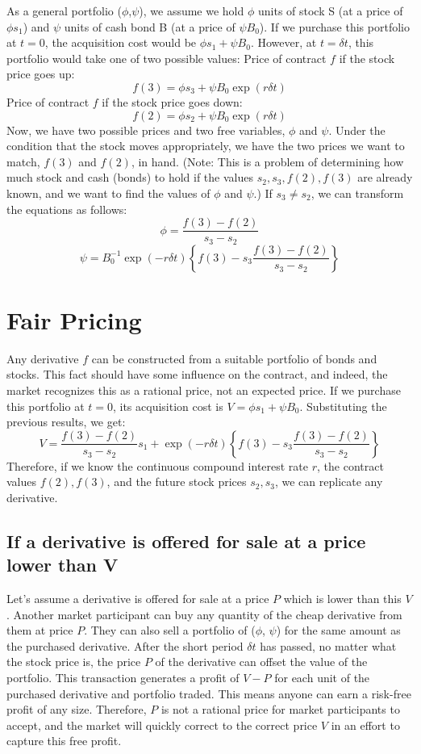 \documentclass[uplatex,a4j,12pt,dvipdfmx]{jsarticle}
\begin{document}
As a general portfolio ($\phi$,$\psi$), we assume we hold $\phi$ units of stock S (at a price of $\phi s_1$) and $\psi$ units of cash bond B (at a price of $\psi B_0$). If we purchase this portfolio at $t=0$, the acquisition cost would be $\phi s_1 + \psi B_0$. However, at $t=\delta t$, this portfolio would take one of two possible values:
Price of contract $f$ if the stock price goes up: \[f(3) = \phi s_3 + \psi B_0\exp(r\delta t)\]
Price of contract $f$ if the stock price goes down: \[f(2) = \phi s_2 + \psi B_0\exp(r\delta t)\]
Now, we have two possible prices and two free variables, $\phi$ and $\psi$. Under the condition that the stock moves appropriately, we have the two prices we want to match, $f(3)$ and $f(2)$, in hand. (Note: This is a problem of determining how much stock and cash (bonds) to hold if the values $s_2, s_3, f(2), f(3)$ are already known, and we want to find the values of $\phi$ and $\psi$.) If $s_3 \neq s_2$, we can transform the equations as follows:
\[\phi = \frac{f(3) - f(2)}{s_3 - s_2}\]
\[\psi = B_0^{-1} \exp(-r\delta t) \left\{ f(3) - s_3 \frac{f(3) - f(2)}{s_3 - s_2} \right\}\]

\section{Fair Pricing}
Any derivative $f$ can be constructed from a suitable portfolio of bonds and stocks. This fact should have some influence on the contract, and indeed, the market recognizes this as a rational price, not an expected price. If we purchase this portfolio at $t=0$, its acquisition cost is $V = \phi s_1 + \psi B_0$. Substituting the previous results, we get:
\[V = \frac{f(3) - f(2)}{s_3 - s_2} s_1 + \exp(-r\delta t) \left\{ f(3) - s_3 \frac{f(3) - f(2)}{s_3 - s_2} \right\}\]
Therefore, if we know the continuous compound interest rate $r$, the contract values $f(2), f(3)$, and the future stock prices $s_2, s_3$, we can replicate any derivative.

\subsection{If a derivative is offered for sale at a price lower than V}
Let's assume a derivative is offered for sale at a price $P$ which is lower than this $V$. Another market participant can buy any quantity of the cheap derivative from them at price $P$. They can also sell a portfolio of ($\phi$, $\psi$) for the same amount as the purchased derivative. After the short period $\delta t$ has passed, no matter what the stock price is, the price $P$ of the derivative can offset the value of the portfolio. This transaction generates a profit of $V-P$ for each unit of the purchased derivative and portfolio traded. This means anyone can earn a risk-free profit of any size. Therefore, $P$ is not a rational price for market participants to accept, and the market will quickly correct to the correct price $V$ in an effort to capture this free profit.
\end{document}
